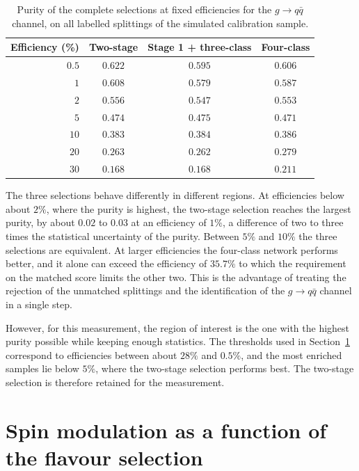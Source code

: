 \begin{table}[htbp]
  \centering
  \caption{Purity of the complete selections at fixed efficiencies for the
  $g \to q\bar{q}$ channel, on all labelled splittings of the simulated
  calibration sample.}
  \label{tab:purity-full}
  \begin{tabular}{rccc}
    \toprule
    Efficiency (\%) & Two-stage & Stage 1 + three-class & Four-class \\
    \midrule
    $0.5$ & $0.622$ & $0.595$ & $0.606$ \\
    $1$   & $0.608$ & $0.579$ & $0.587$ \\
    $2$   & $0.556$ & $0.547$ & $0.553$ \\
    $5$   & $0.474$ & $0.475$ & $0.471$ \\
    $10$  & $0.383$ & $0.384$ & $0.386$ \\
    $20$  & $0.263$ & $0.262$ & $0.279$ \\
    $30$  & $0.168$ & $0.168$ & $0.211$ \\
    \bottomrule
  \end{tabular}
\end{table}

The three selections behave differently in different regions. At efficiencies
below about $2\%$, where the purity is highest, the two-stage selection reaches the
largest purity, by about $0.02$ to $0.03$ at an efficiency of $1\%$, a difference
of two to three times the statistical uncertainty of the purity. Between $5\%$ and
$10\%$ the three selections are equivalent. At larger efficiencies the four-class
network performs better, and it alone can exceed the efficiency of $35.7\%$ to
which the requirement on the matched score limits the other two. This is the
advantage of treating the rejection of the unmatched splittings and the
identification of the $g \to q\bar{q}$ channel in a single step.

However, for this measurement, the region of interest is the one with the highest purity
possible while keeping enough statistics. The
thresholds used in Section~\ref{sec:res-modulation} correspond to efficiencies
between about $28\%$ and $0.5\%$, and the most enriched samples lie below $5\%$,
where the two-stage selection performs best. The
two-stage selection is therefore retained for the measurement.

\section{Spin modulation as a function of the flavour selection}
\label{sec:res-modulation}

